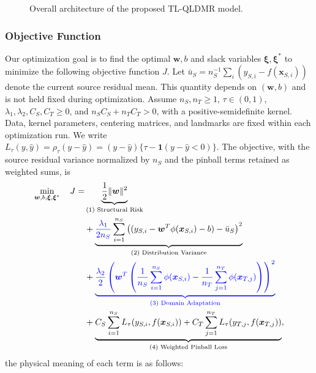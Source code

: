 \documentclass[a4paper]{cas-sc}
\begin{document}
\begin{figure}
\centering
\resizebox{\textwidth}{!}{}
\caption{Overall architecture of the proposed TL-QLDMR model.}
\label{fig:framework}
\end{figure}


\subsubsection{Objective Function}
Our optimization goal is to find the optimal $\boldsymbol{w}, b$ and slack variables $\boldsymbol{\xi}, \boldsymbol{\xi}^*$ to minimize the following objective function $J$. {\color{blue}Let $\bar{u}_S=n_S^{-1}\sum_i(y_{S,i}-f(\boldsymbol{x}_{S,i}))$ denote the current source residual mean. This quantity depends on $(\boldsymbol{w},b)$ and is not held fixed during optimization. Assume $n_S,n_T\ge1$, $\tau\in(0,1)$, $\lambda_1,\lambda_2,C_S,C_T\ge0$, and $n_SC_S+n_TC_T>0$, with a positive-semidefinite kernel. Data, kernel parameters, centering matrices, and landmarks are fixed within each optimization run. We write $L_\tau(y,\hat y)=\rho_\tau(y-\hat y)=(y-\hat y)\{\tau-\mathbf{1}(y-\hat y<0)\}$. The objective, with the source residual variance normalized by $n_S$ and the pinball terms retained as weighted sums, is}
\begin{equation}
\label{eq:objective}
\begin{aligned}
\min_{\boldsymbol{w}, b, \boldsymbol{\xi}, \boldsymbol{\xi}^*} \quad J = & \underbrace{\frac{1}{2} \|\boldsymbol{w}\|^2}_{\text{(1) Structural Risk}} \\
& + \underbrace{{\color{blue}\frac{\lambda_1}{2n_S}} \sum_{i=1}^{n_S} \left( (y_{S,i} - \boldsymbol{w}^T\phi(\boldsymbol{x}_{S,i}) - b) - \bar{u}_S \right)^2}_{\text{(2) Distribution Variance}} \\
& + \color{blue}\underbrace{\frac{\lambda_2}{2} \left( \boldsymbol{w}^T\left( \frac{1}{n_S} \sum_{i=1}^{n_S} \phi(\boldsymbol{x}_{S,i}) - \frac{1}{n_T} \sum_{j=1}^{n_T} \phi(\boldsymbol{x}_{T,j}) \right) \right)^2}_{\text{(3) Domain Adaptation}}\color{black} \\
& + \underbrace{C_S \sum_{i=1}^{n_S} L_{\tau}(y_{S,i}, f(\boldsymbol{x}_{S,i})) + C_T \sum_{j=1}^{n_T} L_{\tau}(y_{T,j}, f(\boldsymbol{x}_{T,j}))}_{\text{(4) Weighted Pinball Loss}},
\end{aligned}
\end{equation}
the physical meaning of each term is as follows:
\end{document}
